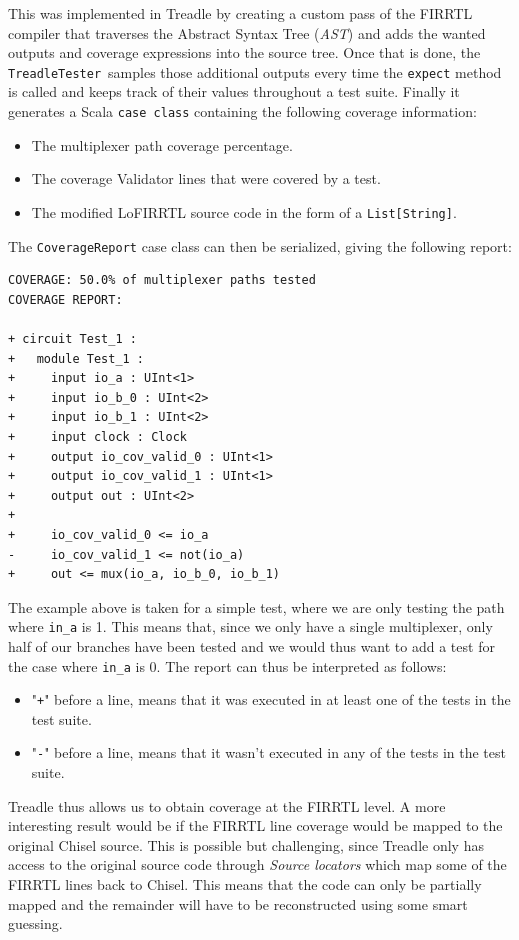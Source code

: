 \documentclass[runningheads]{llncs}
\begin{document}
This was implemented in Treadle by creating a custom pass of the FIRRTL compiler that traverses the Abstract Syntax Tree (\textit{AST}) and adds the wanted outputs and coverage expressions into the source tree. Once that is done, the \texttt{TreadleTester} samples those additional outputs every time the \texttt{expect} method is called and keeps track of their values throughout a test suite. Finally it generates a Scala \texttt{case class} containing the following coverage information:
\begin{itemize}
\item The multiplexer path coverage percentage.
\item The coverage Validator lines that were covered by a test.
\item The modified LoFIRRTL source code in the form of a \texttt{List[String]}.
\end{itemize}
The \texttt{CoverageReport} case class can then be serialized, giving the following report:
\begin{verbatim}
COVERAGE: 50.0% of multiplexer paths tested
COVERAGE REPORT:

+ circuit Test_1 :
+   module Test_1 :
+     input io_a : UInt<1>
+     input io_b_0 : UInt<2>
+     input io_b_1 : UInt<2>
+     input clock : Clock
+     output io_cov_valid_0 : UInt<1>
+     output io_cov_valid_1 : UInt<1>
+     output out : UInt<2>
+   
+     io_cov_valid_0 <= io_a
-     io_cov_valid_1 <= not(io_a)
+     out <= mux(io_a, io_b_0, io_b_1)
\end{verbatim}
The example above is taken for a simple test, where we are only testing the path where \texttt{in\_a} is 1. This means that, since we only have a single multiplexer, only half of our branches have been tested and we would thus want to add a test for the case where \texttt{in\_a} is 0. The report can thus be interpreted as follows:  
\begin{itemize}
\item "\texttt{+}" before a line, means that it was executed in at least one of the tests in the test suite.
\item "\texttt{-}" before a line, means that it wasn't executed in any of the tests in the test suite.\\
\end{itemize}

Treadle thus allows us to obtain coverage at the FIRRTL level. A more interesting result would be if the FIRRTL line coverage would be mapped to the original Chisel source. This is possible but challenging, since Treadle only has access to the original source code through \textit{Source locators} which map some of the FIRRTL lines back to Chisel. This means that the code can only be partially mapped and the remainder will have to be reconstructed using some smart guessing.\\
\end{document}
